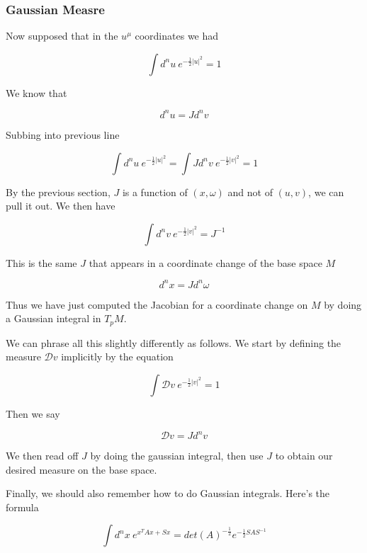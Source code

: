 \subsubsection{Gaussian Measre}

    Now supposed that in the $u^\mu$ coordinates we had

    \begin{equation}
        \int d^n u ~ e^{-\frac12 |u|^2} = 1
    \end{equation}

    We know that

    \begin{equation}
        d^n u = J d^n v
    \end{equation}

    Subbing into previous line

    \begin{equation}
        \int d^n u ~ e^{-\frac12 |u|^2} = \int J d^n v ~ e^{-\frac12 |v|^2} = 1
    \end{equation}

    By the previous section, $J$ is a function of $(x, \omega)$ and not of $(u, v)$, we can pull it out. We then have

    \begin{equation}
        \int d^n v ~ e^{-\frac12 |v|^2} = J^{-1}
    \end{equation}

    This is the same $J$ that appears in a coordinate change of the base space $M$

    \begin{equation}
        d^n x = J d^n \omega
    \end{equation}

    Thus we have just computed the Jacobian for a coordinate change on $M$ by doing a Gaussian integral in $T_p M$.

    We can phrase all this slightly differently as follows. We start by defining the measure $\mathcal D v$ implicitly by the equation

    \begin{equation}
        \int \mathcal D v ~ e^{-\frac12 |v|^2} = 1
    \end{equation}

    Then we say

    \begin{equation}
        \mathcal D v = J d^n v
    \end{equation}

    We then read off $J$ by doing the gaussian integral, then use $J$ to obtain our desired measure on the base space.

    Finally, we should also remember how to do Gaussian integrals. Here's the formula

    \begin{equation}
        \int d^n x ~ e^{x^T A x + Sx} = det(A)^{-\frac12} e^{ - \frac12 S A S^{-1}}
    \end{equation}

